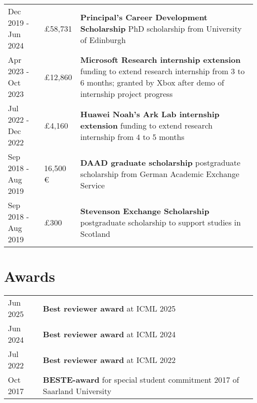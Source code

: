\documentclass[a4paper,12pt]{article}
\begin{document}
\begin{tabularx}{\linewidth}{@{}l l X@{}}
    Dec 2019 - Jun 2024 & \pounds 58,731 & \textbf{Principal's Career Development Scholarship} \newline PhD scholarship from University of Edinburgh \\
    Apr 2023 - Oct 2023 & \pounds 12,860 & \textbf{Microsoft Research internship extension} \newline funding to extend research internship from 3 to 6 months; granted by Xbox after demo of internship project progress\\
    Jul 2022 - Dec 2022 & \pounds 4,160 & \textbf{Huawei Noah's Ark Lab internship extension} \newline funding to extend research internship from 4 to 5 months\\
    Sep 2018 - Aug 2019 & 16,500 \euro & \textbf{DAAD graduate scholarship} \newline postgraduate scholarship from German Academic Exchange Service\\
    Sep 2018 - Aug 2019 & \pounds 300 & \textbf{Stevenson Exchange Scholarship} \newline postgraduate scholarship to support studies in Scotland
\end{tabularx}


\section{Awards}
\begin{tabularx}{\linewidth}{@{}l X@{}}
    Jun 2025 & \textbf{Best reviewer award} at ICML 2025 \\
    Jun 2024 & \textbf{Best reviewer award} at ICML 2024 \\
    Jul 2022 & \textbf{Best reviewer award} at ICML 2022 \\
    Oct 2017 & \textbf{BESTE-award} for special student commitment 2017 of Saarland University
\end{tabularx}
\end{document}
